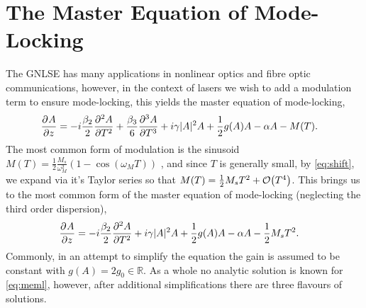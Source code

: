 \section{The Master Equation of Mode-Locking}
\label{chap:meml}
The GNLSE has many applications in nonlinear optics and fibre optic communications, however, in the context of lasers we wish to add a modulation term to ensure mode-locking, this yields the master equation of mode-locking, \cite{hausbook, haus1975, haus1986, haus1992, haus2000, kartner, tamura, usechak}
\begin{align}
\pdiff{A}{z} &= - i \frac{\beta_2}{2}\pdiff[2]{A}{T} + \frac{\beta_3}{6}\pdiff[3]{A}{T} + i \gamma |A|^2 A + \frac{1}{2}g(A) A - \alpha A - M(T).
\end{align}
The most common form of modulation is the sinusoid $M(T) = \frac{1}{2}\frac{M_s}{\omega_M^2} \left( 1 - \cos \left( \omega_M T \right) \right)$ \cite{hausbook, haus1975, haus1996, kartner}, and since $T$ is generally small, by \eqref{eq:shift}, we expand via it's Taylor series so that $M(T) = \frac{1}{2}M_s T^2 + \bigO{T^4}$. This brings us to the most common form of the master equation of mode-locking (neglecting the third order dispersion),
\begin{align}
\label{eq:meml}
\pdiff{A}{z} &= - i \frac{\beta_2}{2}\pdiff[2]{A}{T} + i \gamma |A|^2 A + \frac{1}{2}g(A) A - \alpha A - \frac{1}{2}M_s T^2.
\end{align}
Commonly, in an attempt to simplify the equation the gain is assumed to be constant with $g(A) = 2g_0 \in \mathbb{R}$. As a whole no analytic solution is known for \eqref{eq:meml}, however, after additional simplifications there are three flavours of solutions. \\

